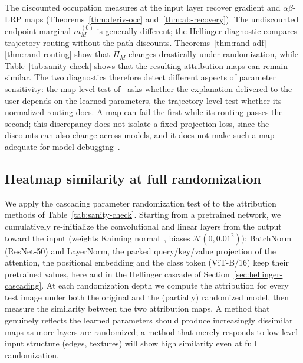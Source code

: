 \documentclass[twoside]{article}
\newif\ifch \chfalse
\newcommand{\ch}[1]{\ifch\textcolor{magenta}{#1}\else#1\fi}
\newcommand{\1}{\mathbf{1}}
\begin{document}
The discounted occupation measures at the input layer recover gradient and $\alpha\beta$-\ac{LRP} maps
(Theorems~\ref{thm:deriv-occ} and~\ref{thm:ab-recovery}). The undiscounted endpoint marginal $m^{(0)}_M$ is generally different; the Hellinger diagnostic compares trajectory routing without the path discounts.
Theorems~\ref{thm:rand-adf}--\ref{thm:rand-routing} show that $\Pi_M$ changes drastically under
randomization, while Table~\ref{tab:sanity-check} shows that the resulting attribution maps can remain similar. \ch{The two
diagnostics therefore detect different aspects of parameter sensitivity: the map-level test
of~\citet{Adebayo2018sanity} asks whether the explanation delivered to the user depends on the
learned parameters, the trajectory-level test whether its normalized routing does. A map can fail
the first while its routing passes the second; this discrepancy does not isolate a fixed projection
loss, since the discounts can also change across models, and it does not make such a
map adequate for model debugging~\citep{Adebayo2018sanity, sixt2020whenexplanationslie}.}

\subsection{Heatmap similarity at full randomization}\label{app:sanity-heatmap}

We apply the cascading parameter randomization test of \citet{Adebayo2018sanity} to the attribution
methods of Table~\ref{tab:sanity-check}. Starting from a pretrained network, we cumulatively
re-initialize the convolutional and linear layers from the output toward the input (weights Kaiming
normal~\citep{He2015delving}, biases $\mathcal{N}(0, 0.01^2)$); BatchNorm (ResNet-50) and
LayerNorm, the packed query/key/value projection of the attention, the positional embedding and the
class token (ViT-B/16) keep their pretrained values, here and in the Hellinger cascade of
Section~\ref{sec:hellinger-cascading}. At each randomization depth we compute the attribution for
every test image under both the original and the (partially) randomized model, then measure the
similarity between the two attribution maps. A method that genuinely reflects the learned
parameters should produce increasingly dissimilar maps as more layers are randomized; a method that
merely responds to low-level input structure (edges, textures) will show high similarity even at
full randomization.
\end{document}
